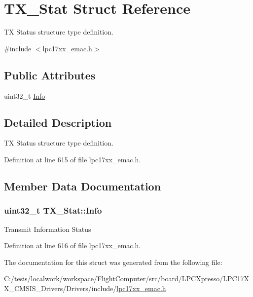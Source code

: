 \hypertarget{struct_t_x___stat}{\section{\-T\-X\-\_\-\-Stat \-Struct \-Reference}
\label{struct_t_x___stat}
}


\-T\-X \-Status structure type definition.  




{\ttfamily \#include $<$lpc17xx\-\_\-emac.\-h$>$}

\subsection*{\-Public \-Attributes}
\begin{DoxyCompactItemize}
\item 
uint32\-\_\-t \hyperlink{struct_t_x___stat_a60ce5a015b8ce362f112d68e6cdfea50}{\-Info}
\end{DoxyCompactItemize}


\subsection{\-Detailed \-Description}
\-T\-X \-Status structure type definition. 

\-Definition at line 615 of file lpc17xx\-\_\-emac.\-h.



\subsection{\-Member \-Data \-Documentation}
\hypertarget{struct_t_x___stat_a60ce5a015b8ce362f112d68e6cdfea50}{
\subsubsection[{\-Info}]{\setlength{\rightskip}{0pt plus 5cm}uint32\-\_\-t {\bf \-T\-X\-\_\-\-Stat\-::\-Info}}}\label{struct_t_x___stat_a60ce5a015b8ce362f112d68e6cdfea50}
\-Transmit \-Information \-Status 

\-Definition at line 616 of file lpc17xx\-\_\-emac.\-h.



\-The documentation for this struct was generated from the following file\-:\begin{DoxyCompactItemize}
\item 
\-C\-:/tesis/localwork/workspace/\-Flight\-Computer/src/board/\-L\-P\-C\-Xpresso/\-L\-P\-C17\-X\-X\-\_\-\-C\-M\-S\-I\-S\-\_\-\-Drivers/\-Drivers/include/\hyperlink{lpc17xx__emac_8h}{lpc17xx\-\_\-emac.\-h}\end{DoxyCompactItemize}

